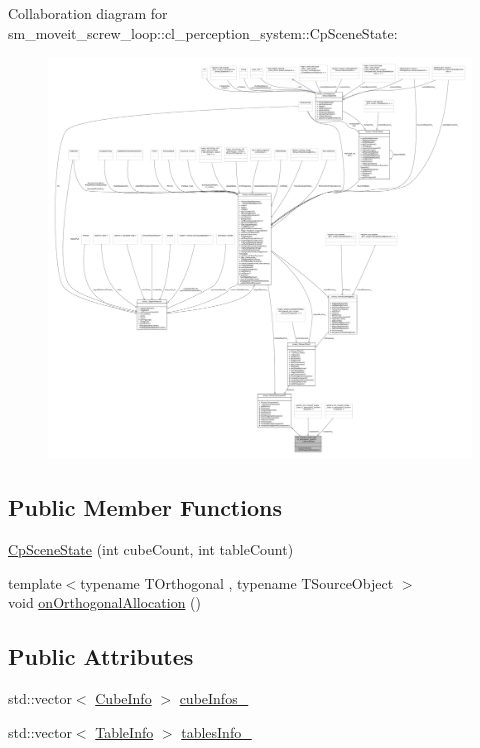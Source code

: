 Collaboration diagram for sm\+\_\+moveit\+\_\+screw\+\_\+loop\+:\+:cl\+\_\+perception\+\_\+system\+:\+:Cp\+Scene\+State\+:
\nopagebreak
\begin{figure}[H]
\begin{center}
\leavevmode
\includegraphics[width=350pt]{classsm__moveit__screw__loop_1_1cl__perception__system_1_1CpSceneState__coll__graph}
\end{center}
\end{figure}
\subsection*{Public Member Functions}
\begin{DoxyCompactItemize}
\item 
\hyperlink{classsm__moveit__screw__loop_1_1cl__perception__system_1_1CpSceneState_a3bd37c24f255cce5b53d52f31547f8d3}{Cp\+Scene\+State} (int cube\+Count, int table\+Count)
\item 
{\footnotesize template$<$typename T\+Orthogonal , typename T\+Source\+Object $>$ }\\void \hyperlink{classsm__moveit__screw__loop_1_1cl__perception__system_1_1CpSceneState_a28c6752f5a0fae9da16692e4d0ae97e5}{on\+Orthogonal\+Allocation} ()
\end{DoxyCompactItemize}
\subsection*{Public Attributes}
\begin{DoxyCompactItemize}
\item 
std\+::vector$<$ \hyperlink{structsm__moveit__screw__loop_1_1cl__perception__system_1_1CubeInfo}{Cube\+Info} $>$ \hyperlink{classsm__moveit__screw__loop_1_1cl__perception__system_1_1CpSceneState_afef6eaf7eb94cf74b9333a373b2fb35d}{cube\+Infos\+\_\+}
\item 
std\+::vector$<$ \hyperlink{structsm__moveit__screw__loop_1_1cl__perception__system_1_1TableInfo}{Table\+Info} $>$ \hyperlink{classsm__moveit__screw__loop_1_1cl__perception__system_1_1CpSceneState_a13c7fd5645885ad697cedb48edbb3f09}{tables\+Info\+\_\+}
\end{DoxyCompactItemize}
